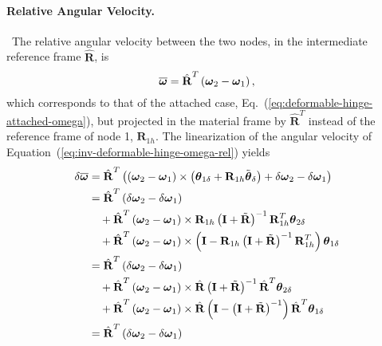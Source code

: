 \documentclass[10pt,dvips,fleqn,subeqn]{report}
\newcommand{\T}[1]{\bm{\mathbf{#1}}}
\newcommand{\TT}[1]{\bm{\mathbf{#1}}}
\begin{document}
\paragraph{Relative Angular Velocity.} \
The relative angular velocity between the two nodes,
in the intermediate reference frame $\hat{\T{R}}$, is
\begin{equation}
	\overline{\T{\omega}} = \hat{\T{R}}^T \plbr{\T{\omega}_2 - \T{\omega}_1}
	\label{eq:inv-deformable-hinge-omega-rel} ,
\end{equation}
which corresponds to that of the attached case,
Eq.~(\ref{eq:deformable-hinge-attached-omega}),
but projected in the material frame by $\hat{\TT{R}}^T$
instead of the reference frame of node 1, $\T{R}_{1h}$.
The linearization of the angular velocity 
of Equation~(\ref{eq:inv-deformable-hinge-omega-rel}) yields
\begin{align}
	\delta\overline{\T{\omega}}
	&= \hat{\T{R}}^T \plbr{
		\plbr{\T{\omega}_2 - \T{\omega}_1} \times \plbr{\T{\theta}_{1\delta} + \T{R}_{1h} \tilde{\T{\theta}}_{\delta}}
		+ \delta\T{\omega}_2 - \delta\T{\omega}_1
	} \nonumber \\
	&= \hat{\T{R}}^T \plbr{
		\delta\T{\omega}_2 - \delta\T{\omega}_1
	} \nonumber \\
	& \mbox{\hspace{10pt}} + \hat{\T{R}}^T \plbr{\T{\omega}_2 - \T{\omega}_1} \times 
			\T{R}_{1h}\plbr{\T{I} + \tilde{\T{R}}}^{-1} \T{R}_{1h}^T \T{\theta}_{2\delta} \nonumber \\
	& \mbox{\hspace{10pt}} + \hat{\T{R}}^T \plbr{\T{\omega}_2 - \T{\omega}_1} \times
			\plbr{\T{I} - \T{R}_{1h}\plbr{\T{I} + \tilde{\T{R}}}^{-1} \T{R}_{1h}^T} \T{\theta}_{1\delta} \nonumber \\
	&= \hat{\T{R}}^T \plbr{
		\delta\T{\omega}_2 - \delta\T{\omega}_1
	} \nonumber \\
	& \mbox{\hspace{10pt}} + \hat{\T{R}}^T \plbr{\T{\omega}_2 - \T{\omega}_1} \times 
			\hat{\T{R}}\plbr{\T{I} + \tilde{\T{R}}}^{-1} \hat{\T{R}}^T \T{\theta}_{2\delta} \nonumber \\
	& \mbox{\hspace{10pt}} + \hat{\T{R}}^T \plbr{\T{\omega}_2 - \T{\omega}_1} \times
			\hat{\T{R}}\plbr{\T{I} - \plbr{\T{I} + \tilde{\T{R}}}^{-1}} \hat{\T{R}}^T \T{\theta}_{1\delta} \nonumber \\
	&= \hat{\T{R}}^T \plbr{
		\delta\T{\omega}_2 - \delta\T{\omega}_1
	} \nonumber \\

\end{align}
\end{document}
